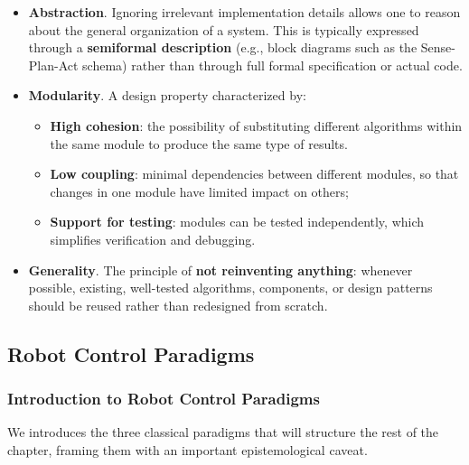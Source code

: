 \begin{itemize}
\item \textbf{Abstraction}.
Ignoring irrelevant implementation details allows one to reason about the general organization of a system. This is typically expressed through a \textbf{semiformal description} (e.g., block diagrams such as the Sense-Plan-Act schema) rather than through full formal specification or actual code.


\item \textbf{Modularity}.
A design property characterized by:
\begin{itemize}
    \item \textbf{High cohesion}: the possibility of substituting different algorithms within the same module to produce the same type of results.

    \vspace{0.2cm}
    \item \textbf{Low coupling}: minimal dependencies between different modules, so that changes in one module have limited impact on others;

    \vspace{0.2cm}
    \item \textbf{Support for testing}: modules can be tested independently, which simplifies verification and debugging.
\end{itemize}


\item \textbf{Generality}.
The principle of \textbf{not reinventing anything}: whenever possible, existing, well-tested algorithms, components, or design patterns should be reused rather than redesigned from scratch.
\end{itemize}

\subsection{Robot Control Paradigms}

\subsubsection{Introduction to Robot Control Paradigms}

We introduces the three classical paradigms that will structure the rest of the chapter, framing them with an important epistemological caveat.

